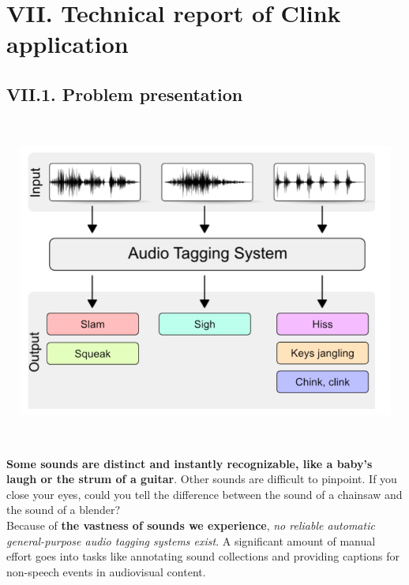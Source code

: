 \documentclass[11pt, a4papper]{report}
\theoremstyle{plain}
\theoremstyle{definition}
\theoremstyle{definition}
\theoremstyle{proposition}
\begin{document}


\chapter*{VII. Technical report of Clink application}

\section*{VII.1. Problem presentation}
\

\begin{center}
\includegraphics[width=16.5cm,height=9cm,keepaspectratio]{competiton-description}
\end{center}
\

\textbf{Some sounds are distinct and instantly recognizable, like a baby’s laugh or the strum of a guitar}. Other sounds are difficult to pinpoint. If you close your eyes, could you tell the difference between the sound of a chainsaw and the sound of a blender?
\\

Because of \textbf{the vastness of sounds we experience}, \textit{no reliable automatic general-purpose audio tagging systems exist}. A significant amount of manual effort goes into tasks like annotating sound collections and providing captions for non-speech events in audiovisual content.
\\
\end{document}
